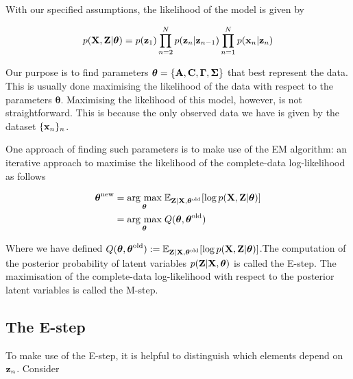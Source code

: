 \documentclass[11pt]{article}
\newcommand{\argmax}[1]{\underset{#1}{\operatorname{arg}\,\operatorname{max}}\;}
\begin{document}
With our specified assumptions, the likelihood of the model is given by

\begin{equation}
	p({\bf X}, {\bf Z}\vert\boldsymbol\theta) = p({\bf z}_1)\prod_{n=2}^N p({\bf z}_n\vert {\bf z}_{n-1})\prod_{n=1}^N p({\bf x}_n\vert {\bf z}_n)
\end{equation}

Our purpose is to find parameters $\boldsymbol\theta = \{{\bf A}, {\bf C}, \boldsymbol\Gamma, \boldsymbol\Sigma\}$ that best represent the data. This is usually done maximising the likelihood of the data with respect to the parameters $\boldsymbol{\theta}$. Maximising the likelihood of this model, however, is not straightforward. This is because the only observed data we have is given by the dataset $\{{\bf x}_n\}_n$. %


One approach of finding such parameters is to make use of the EM algorithm: an iterative approach to maximise the likelihood of the complete-data log-likelihood as follows

\begin{align}
	\boldsymbol{\theta}^\text{new} &= \argmax{\boldsymbol{\theta}} \mathbb{E}_{{\bf Z}\vert {\bf X}, \boldsymbol{\theta}^\text{old}}[\log p({\bf X}, {\bf Z}\vert \boldsymbol\theta)]\\
	&= \argmax{\boldsymbol{\theta}} Q(\boldsymbol\theta, \boldsymbol\theta^\text{old})
\end{align}

Where we have defined $Q(\boldsymbol\theta, \boldsymbol\theta^\text{old}) := \mathbb{E}_{{\bf Z}\vert {\bf X}, \boldsymbol{\theta}^\text{old}}[\log p({\bf X}, {\bf Z}\vert \boldsymbol\theta)]$.The computation of the posterior probability of latent variables $p({\bf Z}\vert {\bf X}, \boldsymbol\theta)$ is called the E-step. The maximisation of the complete-data log-likelihood with respect to the posterior latent variables is called the M-step.


\subsection{The E-step}
To make use of the E-step, it is helpful to distinguish which elements depend on ${\bf z}_n$. Consider
\end{document}
